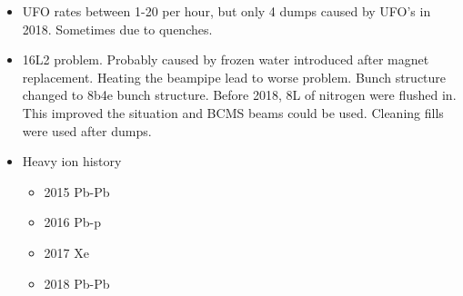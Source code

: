 \begin{itemize}
\begin{enumerate}
\begin{center}
        \end{center}
    \end{enumerate}
    \item UFO rates between 1-20 per hour, but only 4 dumps caused by UFO's in 2018. Sometimes due to quenches. \cite{lhcRun2}
    \item 16L2 problem. Probably caused by frozen water introduced after magnet replacement. Heating the beampipe lead to worse problem. Bunch structure changed to 8b4e bunch structure. Before 2018, 8L of nitrogen were flushed in. This improved the situation and BCMS beams could be used. Cleaning fills were used after dumps. \cite{lhcRun2}
    \item Heavy ion history \cite{lhcRun2}
    \begin{itemize}
        \item 2015 Pb-Pb \cite{lhcRun2}
        \item 2016 Pb-p \cite{lhcRun2}
        \item 2017 Xe \cite{lhcRun2}
        \item 2018 Pb-Pb \cite{lhcRun2}
    \end{itemize}
\end{itemize}


